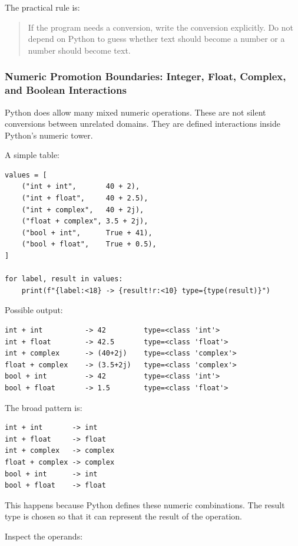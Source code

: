 The practical rule is:

\begin{quote}
If the program needs a conversion, write the conversion explicitly. Do not depend on Python to guess whether text should become a number or a number should become text.
\end{quote}

\subsubsection{Numeric Promotion Boundaries: Integer, Float, Complex, and Boolean Interactions}

Python does allow many mixed numeric operations. These are not silent conversions between unrelated domains. They are defined interactions inside Python's numeric tower.

A simple table:

\begin{verbatim}
values = [
    ("int + int",       40 + 2),
    ("int + float",     40 + 2.5),
    ("int + complex",   40 + 2j),
    ("float + complex", 3.5 + 2j),
    ("bool + int",      True + 41),
    ("bool + float",    True + 0.5),
]

for label, result in values:
    print(f"{label:<18} -> {result!r:<10} type={type(result)}")
\end{verbatim}

Possible output:

\begin{verbatim}
int + int          -> 42         type=<class 'int'>
int + float        -> 42.5       type=<class 'float'>
int + complex      -> (40+2j)    type=<class 'complex'>
float + complex    -> (3.5+2j)   type=<class 'complex'>
bool + int         -> 42         type=<class 'int'>
bool + float       -> 1.5        type=<class 'float'>
\end{verbatim}

The broad pattern is:

\begin{verbatim}
int + int       -> int
int + float     -> float
int + complex   -> complex
float + complex -> complex
bool + int      -> int
bool + float    -> float
\end{verbatim}

This happens because Python defines these numeric combinations. The result type is chosen so that it can represent the result of the operation.

Inspect the operands:

